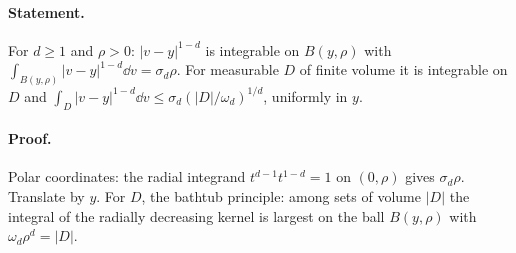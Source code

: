 \paragraph{Statement.} For $d\geq1$ and $\rho>0$: $|v-y|^{1-d}$ is integrable on $B(y,\rho)$ with
$\int_{B(y,\rho)}|v-y|^{1-d}\dd v=\sigma_d\rho$. For measurable $D$ of finite volume it is integrable
on $D$ and $\int_D|v-y|^{1-d}\dd v\leq\sigma_d(|D|/\omega_d)^{1/d}$, uniformly in $y$.
\paragraph{Proof.} Polar coordinates: the radial integrand $t^{d-1}t^{1-d}=1$ on $(0,\rho)$ gives
$\sigma_d\rho$. Translate by $y$. For $D$, the bathtub principle: among sets of volume $|D|$ the
integral of the radially decreasing kernel is largest on the ball $B(y,\rho)$ with
$\omega_d\rho^d=|D|$.
